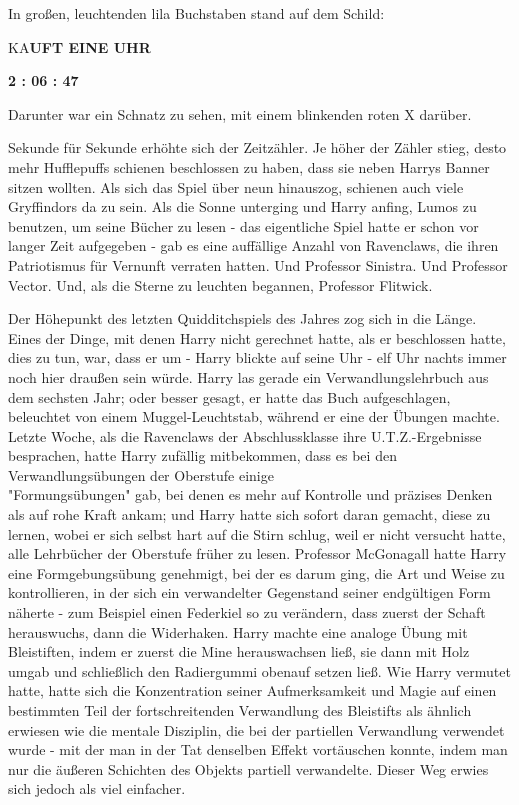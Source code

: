 {In großen, leuchtenden lila Buchstaben stand auf dem Schild:

KA\textbf{UFT EINE UHR}

\textbf{2 : 06 : 47}

Darunter war ein Schnatz zu sehen, mit einem blinkenden roten X darüber.

Sekunde für Sekunde erhöhte sich der Zeitzähler. Je höher der Zähler stieg, desto mehr Hufflepuffs schienen beschlossen zu haben, dass sie neben Harrys Banner sitzen wollten. Als sich das Spiel über neun hinauszog, schienen auch viele Gryffindors da zu sein. Als die Sonne unterging und Harry anfing, Lumos zu benutzen, um seine Bücher zu lesen - das eigentliche Spiel hatte er schon vor langer Zeit aufgegeben - gab es eine auffällige Anzahl von Ravenclaws, die ihren Patriotismus für Vernunft verraten hatten. Und Professor Sinistra. Und Professor Vector. Und, als die Sterne zu leuchten begannen, Professor Flitwick.

Der Höhepunkt des letzten Quidditchspiels des Jahres zog sich in die Länge. Eines der Dinge, mit denen Harry nicht gerechnet hatte, als er beschlossen hatte, dies zu tun, war, dass er um - Harry blickte auf seine Uhr - elf Uhr nachts immer noch hier draußen sein würde. Harry las gerade ein Verwandlungslehrbuch aus dem sechsten Jahr; oder besser gesagt, er hatte das Buch aufgeschlagen, beleuchtet von einem Muggel-Leuchtstab, während er eine der Übungen machte. Letzte Woche, als die Ravenclaws der Abschlussklasse ihre U.T.Z.-Ergebnisse besprachen, hatte Harry zufällig mitbekommen, dass es bei den Verwandlungsübungen der Oberstufe einige\\ "Formungsübungen" gab, bei denen es mehr auf Kontrolle und präzises Denken als auf rohe Kraft ankam; und Harry hatte sich sofort daran gemacht, diese zu lernen, wobei er sich selbst hart auf die Stirn schlug, weil er nicht versucht hatte, alle Lehrbücher der Oberstufe früher zu lesen. Professor McGonagall hatte Harry eine Formgebungsübung genehmigt, bei der es darum ging, die Art und Weise zu kontrollieren, in der sich ein verwandelter Gegenstand seiner endgültigen Form näherte - zum Beispiel einen Federkiel so zu verändern, dass zuerst der Schaft herauswuchs, dann die Widerhaken. Harry machte eine analoge Übung mit Bleistiften, indem er zuerst die Mine herauswachsen ließ, sie dann mit Holz umgab und schließlich den Radiergummi obenauf setzen ließ. Wie Harry vermutet hatte, hatte sich die Konzentration seiner Aufmerksamkeit und Magie auf einen bestimmten Teil der fortschreitenden Verwandlung des Bleistifts als ähnlich erwiesen wie die mentale Disziplin, die bei der partiellen Verwandlung verwendet wurde - mit der man in der Tat denselben Effekt vortäuschen konnte, indem man nur die äußeren Schichten des Objekts partiell verwandelte. Dieser Weg erwies sich jedoch als viel einfacher.

}
